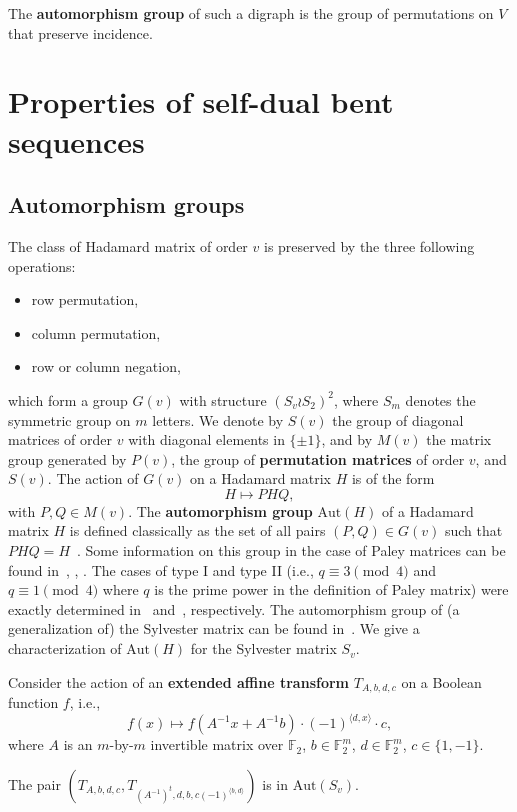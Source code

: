 \documentclass[12pt]{article}
\newcommand{\FF}{\mathbb{F}}
\def\Aut{\mathrm{Aut}}
\begin{document}
The {\bf automorphism group} of such a digraph is the group of permutations on $V$ that preserve incidence.

\section{ Properties of self-dual bent sequences}
\label{sec:prop}
\subsection{Automorphism groups}
The class of Hadamard matrix of order $v$ is preserved by the three following operations:
\begin{itemize}
 \item row permutation,
 \item column permutation,
 \item row or column negation,
\end{itemize}
which form a group $G(v)$ with structure $(S_v \wr S_2)^2$, where $S_m$ denotes the symmetric group on $m$ letters. We denote by $S(v)$ the group of diagonal matrices of order $v$  with diagonal elements in $\{\pm 1\}$,
and by $M(v)$ the matrix group generated by $P(v)$, the group of {\bf permutation matrices} of order $v$,  and $S(v)$.
The action of $G(v)$ on a Hadamard matrix $H$ is of the form
$$ H\mapsto PHQ, $$ with $P,Q \in M(v)$.
The {\bf automorphism group} $\Aut(H)$ of a Hadamard matrix $H$ is defined classically as the set of all pairs $(P,Q) \in G(v)$ such that $PHQ=H$~\cite{Hall:62:Mathieu}.
Some information on this group in the case of Paley matrices can be found
in~\cite{CES:2018},
\cite{Kantor:69:aut},
\cite{deLauFla:2011}.
The cases of type I and type II
(i.e., $q\equiv 3 \pmod{4}$ and $q\equiv 1 \pmod{4}$ where $q$ is the prime power in the definition of Paley matrix) were exactly determined in~\cite{Kantor:69:aut} and~\cite{deLauSta:2008}, respectively.
The automorphism group of (a generalization of) the Sylvester matrix can be found in~\cite[p.\,101--103]{deLauFla:2011}.
We give a characterization of $\Aut(H)$
for the Sylvester matrix $S_v$.

Consider the action of an {\bf extended
affine transform} $T_{A,b,d,c}$ on a Boolean function $f$, i.e.,
$$f(x) \mapsto f(A^{-1}x+A^{-1}b)
 \cdot (-1)^{{\langle d,x\rangle}}
 \cdot c, $$
where $A$ is an $m$-by-$m$ invertible matrix over $\FF_2$,
$b \in \FF_2^m$,
$d \in \FF_2^m$,
$c\in\{1,-1\}$.

{\thm The pair $(T_{A,b,d,c},T_{(A^{-1})^t,d,b,c(-1)^{\langle b,d\rangle}})$
 is in $\Aut(S_v)$. }
\end{document}
